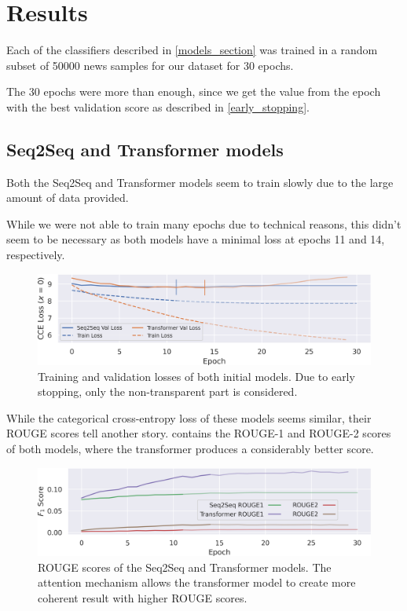 \section{Results}

Each of the classifiers described in \cref{models_section} was trained in a random subset of \num{50000} news samples for our dataset for 30 epochs.

The 30 epochs were more than enough, since we get the value from the epoch with the best validation score as described in \cref{early_stopping}.

\subsection{Seq2Seq and Transformer models}
Both the Seq2Seq and Transformer models seem to train slowly due to the large amount of data provided.

While we were not able to train many epochs due to technical reasons, this didn't seem to be necessary as both models have a minimal loss at epochs 11 and 14, respectively.

\begin{figure}[h]
	\includegraphics[width = \textwidth]{baseline_losses.png}
	\caption{Training and validation losses of both initial models. Due to early stopping, only the non-transparent part is considered.}
\end{figure}

While the categorical cross-entropy loss of these models seems similar, their ROUGE scores tell another story.
 contains the ROUGE-1 and ROUGE-2 scores of both models, where the transformer produces a considerably better score.

\begin{figure}[h]
	\includegraphics[width = \textwidth]{baseline_rouges.png}
	\caption{ROUGE scores of the Seq2Seq and Transformer models. The attention mechanism allows the transformer model to create more coherent result with higher ROUGE scores.}
	\label{baseline_rouges}
\end{figure}

